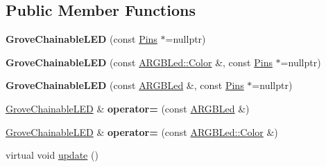 \subsection*{Public Member Functions}
\begin{DoxyCompactItemize}
\item 
\mbox{\label{classwood_box_1_1display_1_1_grove_chainable_l_e_d_a08c28797b0d3710c34639feb2daa5879}} 
{\bfseries Grove\+Chainable\+L\+ED} (const \mbox{\hyperlink{structwood_box_1_1display_1_1_grove_chainable_l_e_d_1_1_pins}{Pins}} $\ast$=nullptr)
\item 
\mbox{\label{classwood_box_1_1display_1_1_grove_chainable_l_e_d_a12ecc3ce0f2316255f3d84f9ab940192}} 
{\bfseries Grove\+Chainable\+L\+ED} (const \mbox{\hyperlink{structwood_box_1_1display_1_1_a_r_g_b_led_1_1_color}{A\+R\+G\+B\+Led\+::\+Color}} \&, const \mbox{\hyperlink{structwood_box_1_1display_1_1_grove_chainable_l_e_d_1_1_pins}{Pins}} $\ast$=nullptr)
\item 
\mbox{\label{classwood_box_1_1display_1_1_grove_chainable_l_e_d_adbcc3b0c30f0f13c29d0020c053cb51b}} 
{\bfseries Grove\+Chainable\+L\+ED} (const \mbox{\hyperlink{classwood_box_1_1display_1_1_a_r_g_b_led}{A\+R\+G\+B\+Led}} \&, const \mbox{\hyperlink{structwood_box_1_1display_1_1_grove_chainable_l_e_d_1_1_pins}{Pins}} $\ast$=nullptr)
\item 
\mbox{\label{classwood_box_1_1display_1_1_grove_chainable_l_e_d_a626699a65f024fb43a9e017bc75eae78}} 
\mbox{\hyperlink{classwood_box_1_1display_1_1_grove_chainable_l_e_d}{Grove\+Chainable\+L\+ED}} \& {\bfseries operator=} (const \mbox{\hyperlink{classwood_box_1_1display_1_1_a_r_g_b_led}{A\+R\+G\+B\+Led}} \&)
\item 
\mbox{\label{classwood_box_1_1display_1_1_grove_chainable_l_e_d_adeb75f0b0d38e8aa842ec75b5944dc6f}} 
\mbox{\hyperlink{classwood_box_1_1display_1_1_grove_chainable_l_e_d}{Grove\+Chainable\+L\+ED}} \& {\bfseries operator=} (const \mbox{\hyperlink{structwood_box_1_1display_1_1_a_r_g_b_led_1_1_color}{A\+R\+G\+B\+Led\+::\+Color}} \&)
\item 
virtual void \mbox{\hyperlink{classwood_box_1_1display_1_1_grove_chainable_l_e_d_a650969665d0b5607465a63159c62e4ef}{update}} ()
\end{DoxyCompactItemize}
